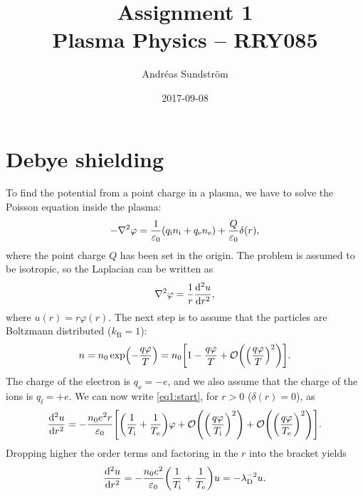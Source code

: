 \documentclass[11pt,a4paper, 
english, swedish %
]{article}
\newcommand{\lD}{\ensuremath{\lambda_{\text{D}}}}
\begin{document}


\title{Assignment 1 \\
{\Large Plasma Physics -- RRY085}}
\author{Andréas Sundström}
\date{2017-09-08}

\maketitle




\section{Debye shielding}
To find the potential from a point charge in a plasma, we have to
solve the Poisson equation inside the plasma:
\begin{equation}\label{eq1:start}
-\laplacian \varphi = 
\frac{1}{\varepsilon_0}\qty(q_\ii n_\ii+ q_\ee n_\ee )
+ \frac{Q}{\varepsilon_0} \delta(r),
\end{equation}
where the point charge $Q$ has been set in the origin. The problem is
assumed to be isotropic, so the Laplacian can be written as
\begin{equation}
\laplacian\varphi = \frac{1}{r}\dv[2]{u}{r},
\end{equation}
where $u(r)=r\varphi(r)$.
The next step is to assume that the particles are Boltzmann
distributed ($k_\text{B}=1$):
\begin{equation}
n=n_0\exp(-\frac{q\varphi}{T})
= n_0\qty[1-\frac{q\varphi}{T} 
+\order{\qty(\frac{q\varphi}{T})^2}].
\end{equation}
The charge of the electron is $q_\ee=-e$, and we also assume that the
charge of the ions is $q_\ii=+e$. 
We can now write \eqref{eq1:start}, for $r>0$ ($\delta(r)=0$), as
\begin{equation}
\dv[2]{u}{r} =
-\frac{n_0e^2r}{\varepsilon_0}\qty[\qty(\frac{1}{T_\ii}+\frac{1}{T_\ee})\varphi
+\order{\qty(\frac{q\varphi}{T_\ii})^2} 
+\order{\qty(\frac{q\varphi}{T_\ee})^2}].
\end{equation}
Dropping higher the order terms and factoring in the $r$ into the
bracket yields
\begin{equation}\label{eq1:ODE}
\dv[2]{u}{r} =-\frac{n_0e^2}{\varepsilon_0}
\qty(\frac{1}{T_\ii}+\frac{1}{T_\ee})u
=-\lD^{-2}u.
\end{equation}
\end{document}
